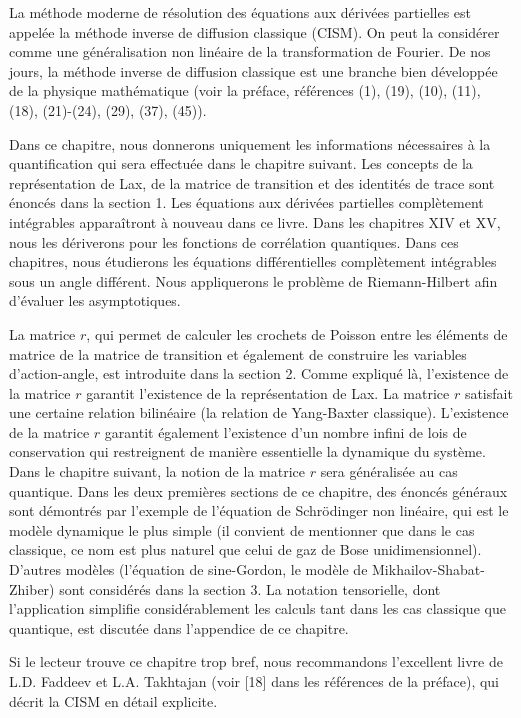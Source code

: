 La méthode moderne de résolution des équations aux dérivées partielles est appelée la méthode inverse de diffusion classique (CISM). On peut la considérer comme une généralisation non linéaire de la transformation de Fourier. De nos jours, la méthode inverse de diffusion classique est une branche bien développée de la physique mathématique (voir la préface, références (1), (19), (10), (11), (18), (21)-(24), (29), (37), (45)). 

Dans ce chapitre, nous donnerons uniquement les informations nécessaires à la quantification qui sera effectuée dans le chapitre suivant. Les concepts de la représentation de Lax, de la matrice de transition et des identités de trace sont énoncés dans la section 1. Les équations aux dérivées partielles complètement intégrables apparaîtront à nouveau dans ce livre. Dans les chapitres XIV et XV, nous les dériverons pour les fonctions de corrélation quantiques. Dans ces chapitres, nous étudierons les équations différentielles complètement intégrables sous un angle différent. Nous appliquerons le problème de Riemann-Hilbert afin d'évaluer les asymptotiques. 

La matrice \( r \), qui permet de calculer les crochets de Poisson entre les éléments de matrice de la matrice de transition et également de construire les variables d'action-angle, est introduite dans la section 2. Comme expliqué là, l'existence de la matrice \( r \) garantit l'existence de la représentation de Lax. La matrice \( r \) satisfait une certaine relation bilinéaire (la relation de Yang-Baxter classique). L'existence de la matrice \( r \) garantit également l'existence d'un nombre infini de lois de conservation qui restreignent de manière essentielle la dynamique du système. Dans le chapitre suivant, la notion de la matrice \( r \) sera généralisée au cas quantique. Dans les deux premières sections de ce chapitre, des énoncés généraux sont démontrés par l'exemple de l'équation de Schrödinger non linéaire, qui est le modèle dynamique le plus simple (il convient de mentionner que dans le cas classique, ce nom est plus naturel que celui de gaz de Bose unidimensionnel). D'autres modèles (l'équation de sine-Gordon, le modèle de Mikhailov-Shabat-Zhiber) sont considérés dans la section 3. La notation tensorielle, dont l'application simplifie considérablement les calculs tant dans les cas classique que quantique, est discutée dans l'appendice de ce chapitre. 

Si le lecteur trouve ce chapitre trop bref, nous recommandons l'excellent livre de L.D. Faddeev et L.A. Takhtajan (voir [18] dans les références de la préface), qui décrit la CISM en détail explicite.
